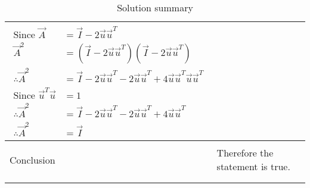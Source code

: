 \begin{longtable}{|l|l|}
{\begin{align*}
    \mbox{Since }\vec{A}&=\vec{I}-2\vec{u}\vec{u}^T\\
    \vec{A}^2&=(\vec{I}-2\vec{u}\vec{u}^T)(\vec{I}-2\vec{u}\vec{u}^T)\\
    \therefore\vec{A}^2&=\vec{I}-2\vec{u}\vec{u}^T-2\vec{u}\vec{u}^T+4\vec{u}\vec{u}^T\vec{u}\vec{u}^T\\
    \mbox{Since }\vec{u}^T\vec{u}&=1\\
    \therefore\vec{A}^2&=\vec{I}-2\vec{u}\vec{u}^T-2\vec{u}\vec{u}^T+4\vec{u}\vec{u}^T\\
    \therefore \vec{A}^2&=\vec{I}
\end{align*}}\\
\hline
&\\
Conclusion&Therefore the statement is true.\\
&\\
\hline
\caption{Solution summary}
\label{eq:solutions/2015/june/78/table:2}
\end{longtable}
\twocolumn
